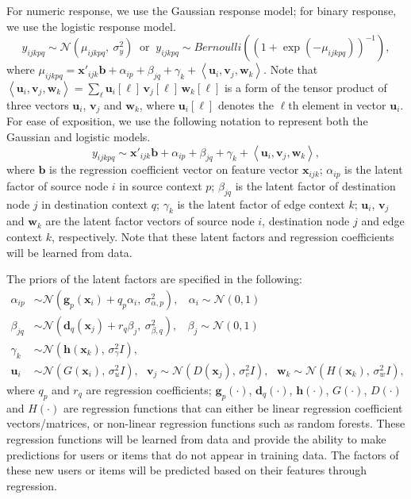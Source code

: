 \documentclass[10pt]{article}
\newcommand{\parahead}[1]{\vspace{0.15in}\noindent{\bf #1:}}
\begin{document}
\parahead{Response model}
For numeric response, we use the Gaussian response model; for binary response, we use the logistic response model.
\begin{equation*}
y_{ijkpq} \sim \mathcal{N}(\mu_{ijkpq},~ \sigma^2_{y}) ~\textrm{ or }~
y_{ijkpq} \sim \textit{Bernoulli}((1 + \exp(-\mu_{ijkpq}))^{-1}),
\end{equation*}
where $\mu_{ijkpq} = \bm{x}'_{ijk} \bm{b} + \alpha_{ip} + \beta_{jq} + \gamma_{k} + \left<\bm{u}_i, \bm{v}_j, \bm{w}_k\right>$.  Note that $\left<\bm{u}_i, \bm{v}_j, \bm{w}_k\right> = \sum_{\ell} \bm{u}_i[\ell]\, \bm{v}_j[\ell]\, \bm{w}_k[\ell]$ is a form of the tensor product of three vectors $\bm{u}_i$, $\bm{v}_j$ and $\bm{w}_k$, where $\bm{u}_i[\ell]$ denotes the $\ell$th element in vector $\bm{u}_i$.
For ease of exposition, we use the following notation to represent both the Gaussian and logistic models.
\begin{equation}
y_{ijkpq} \sim \bm{x}'_{ijk} \bm{b} + \alpha_{ip} + \beta_{jq} + \gamma_{k} + \left<\bm{u}_i, \bm{v}_j, \bm{w}_k\right>, \label{eq:uvw-model}
\end{equation}
where $\bm{b}$ is the regression coefficient vector on feature vector $\bm{x}_{ijk}$; $\alpha_{ip}$ is the latent factor of source node $i$ in source context $p$; $\beta_{jq}$ is the latent factor of destination node $j$ in destination context $q$; $\gamma_{k}$ is the latent factor of edge context $k$; $\bm{u}_i$, $\bm{v}_j$ and $\bm{w}_k$ are the latent factor vectors of source node $i$, destination node $j$ and edge context $k$, respectively.  Note that these latent factors and regression coefficients will be learned from data.

\parahead{Regression Priors}
The priors of the latent factors are specified in the following:
\begin{align}
\alpha_{ip} & \sim \mathcal{N}(\bm{g}_{p}(\bm{x}_{i}) + q_{p} \alpha_i, ~\sigma_{\alpha,p}^2),
	~~~~ \alpha_i \sim \mathcal{N}(0, 1) \label{eq:alpha} \\
\beta_{jq} & \sim \mathcal{N}(\bm{d}_{q}(\bm{x}_{j}) + r_{q} \beta_j, ~\sigma_{\beta,q}^2),
	~~~~ \beta_j  \sim \mathcal{N}(0, 1) \label{eq:beta} \\
\gamma_{k} & \sim \mathcal{N}(\bm{h}(\bm{x}_k), \,\sigma_{\gamma}^2 I), \\
\bm{u}_{i} & \sim \mathcal{N}(G(\bm{x}_i), \,\sigma_{u}^2 I), ~~~
\bm{v}_{j} \sim \mathcal{N}(D(\bm{x}_j), \,\sigma_{v}^2 I), ~~~
\bm{w}_{k} \sim \mathcal{N}(H(\bm{x}_k), \,\sigma_{w}^2 I), \label{eq:uvw}
\end{align}
where $q_p$ and $r_q$ are regression coefficients; $\bm{g}_p(\cdot)$, $\bm{d}_q(\cdot)$, $\bm{h}(\cdot)$, $G(\cdot)$, $D(\cdot)$ and $H(\cdot)$ are regression functions that can either be linear regression coefficient vectors/matrices, or non-linear regression functions such as random forests. These regression functions will be learned from data and provide the ability to make predictions for users or items that do not appear in training data.  The factors of these new users or items will be predicted based on their features through regression.
\end{document}
